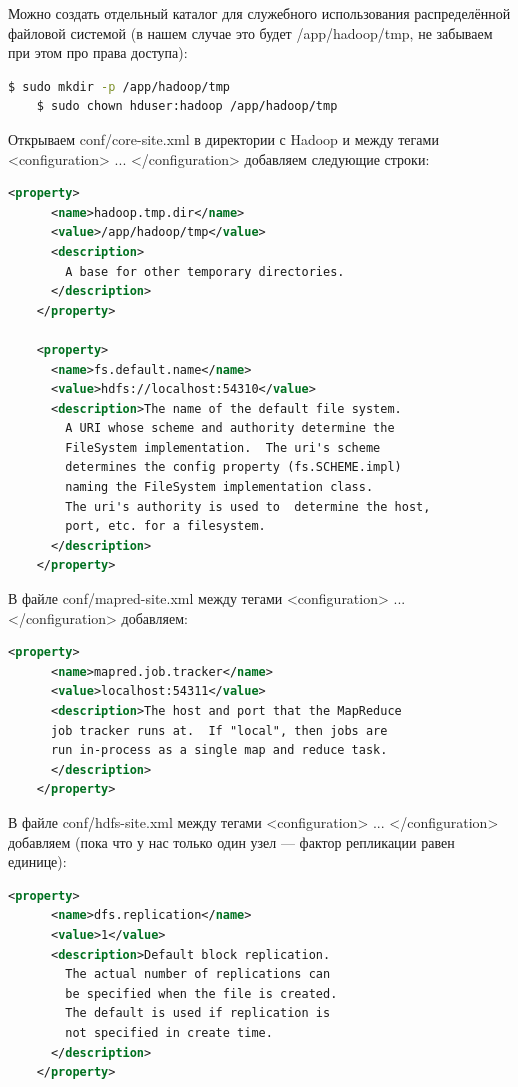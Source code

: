 \documentclass[12pt,a4paper]{extarticle} %
\begin{document}
\noindent Можно создать отдельный каталог для служебного использования распределённой файловой системой (в нашем случае это будет /app/hadoop/tmp, не забываем при этом про права доступа):
\begin{lstlisting}[language=sh]
    $ sudo mkdir -p /app/hadoop/tmp
    $ sudo chown hduser:hadoop /app/hadoop/tmp
\end{lstlisting}

\noindent Открываем conf/core-site.xml в директории с Hadoop и между тегами <configuration> ... </configuration> добавляем следующие строки:
\begin{lstlisting}[language=xml]
    <property>
      <name>hadoop.tmp.dir</name>
      <value>/app/hadoop/tmp</value>
      <description>
        A base for other temporary directories.
      </description>
    </property>
    
    <property>
      <name>fs.default.name</name>
      <value>hdfs://localhost:54310</value>
      <description>The name of the default file system. 
        A URI whose scheme and authority determine the 
        FileSystem implementation.  The uri's scheme
        determines the config property (fs.SCHEME.impl) 
        naming the FileSystem implementation class.  
        The uri's authority is used to  determine the host,
        port, etc. for a filesystem.
      </description>
    </property>
\end{lstlisting}

\noindent В файле conf/mapred-site.xml между тегами <configuration> ... </configuration> добавляем:
\begin{lstlisting}[language=xml]
    <property>
      <name>mapred.job.tracker</name>
      <value>localhost:54311</value>
      <description>The host and port that the MapReduce 
      job tracker runs at.  If "local", then jobs are 
      run in-process as a single map and reduce task.
      </description>
    </property>
\end{lstlisting}

\noindent В файле conf/hdfs-site.xml между тегами <configuration> ... </configuration> добавляем (пока что у нас только один узел --- фактор репликации равен единице):
\begin{lstlisting}[language=xml]
    <property>
      <name>dfs.replication</name>
      <value>1</value>
      <description>Default block replication.
        The actual number of replications can
        be specified when the file is created.  
        The default is used if replication is 
        not specified in create time.
      </description>
    </property>
\end{lstlisting}
\end{document}
